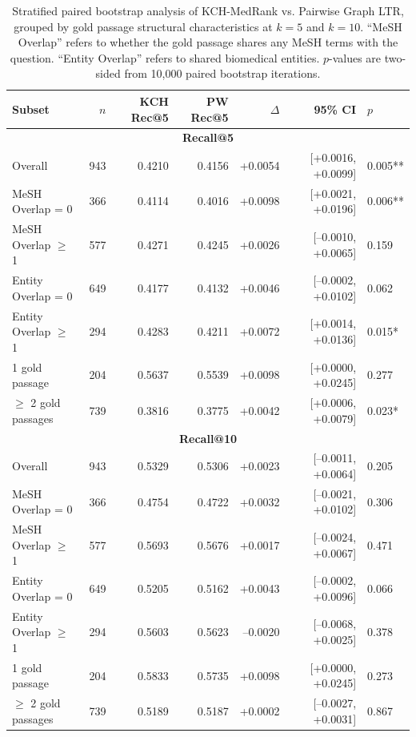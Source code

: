 \begin{table}[t]
\centering
\small
\caption{Stratified paired bootstrap analysis of KCH-MedRank vs. Pairwise Graph LTR, grouped by gold passage structural characteristics at $k=5$ and $k=10$. ``MeSH Overlap'' refers to whether the gold passage shares any MeSH terms with the question. ``Entity Overlap'' refers to shared biomedical entities. $p$-values are two-sided from 10,000 paired bootstrap iterations.}
\label{tab:hypergraph-vs-pairwise-stratified}
\begin{tabular}{lrrrrrl}
\toprule
Subset & $n$ & KCH Rec@5 & PW Rec@5 & $\Delta$ & 95\% CI & $p$ \\
\midrule
\multicolumn{7}{c}{\textbf{Recall@5}} \\
\midrule
Overall & 943 & 0.4210 & 0.4156 & +0.0054 & [+0.0016, +0.0099] & 0.005** \\
\midrule
MeSH Overlap = 0 & 366 & 0.4114 & 0.4016 & +0.0098 & [+0.0021, +0.0196] & 0.006** \\
MeSH Overlap $\geq$ 1 & 577 & 0.4271 & 0.4245 & +0.0026 & [--0.0010, +0.0065] & 0.159 \\
Entity Overlap = 0 & 649 & 0.4177 & 0.4132 & +0.0046 & [--0.0002, +0.0102] & 0.062 \\
Entity Overlap $\geq$ 1 & 294 & 0.4283 & 0.4211 & +0.0072 & [+0.0014, +0.0136] & 0.015* \\
1 gold passage & 204 & 0.5637 & 0.5539 & +0.0098 & [+0.0000, +0.0245] & 0.277 \\
$\geq$ 2 gold passages & 739 & 0.3816 & 0.3775 & +0.0042 & [+0.0006, +0.0079] & 0.023* \\
\midrule
\multicolumn{7}{c}{\textbf{Recall@10}} \\
\midrule
Overall & 943 & 0.5329 & 0.5306 & +0.0023 & [--0.0011, +0.0064] & 0.205 \\
\midrule
MeSH Overlap = 0 & 366 & 0.4754 & 0.4722 & +0.0032 & [--0.0021, +0.0102] & 0.306 \\
MeSH Overlap $\geq$ 1 & 577 & 0.5693 & 0.5676 & +0.0017 & [--0.0024, +0.0067] & 0.471 \\
Entity Overlap = 0 & 649 & 0.5205 & 0.5162 & +0.0043 & [--0.0002, +0.0096] & 0.066 \\
Entity Overlap $\geq$ 1 & 294 & 0.5603 & 0.5623 & --0.0020 & [--0.0068, +0.0025] & 0.378 \\
1 gold passage & 204 & 0.5833 & 0.5735 & +0.0098 & [+0.0000, +0.0245] & 0.273 \\
$\geq$ 2 gold passages & 739 & 0.5189 & 0.5187 & +0.0002 & [--0.0027, +0.0031] & 0.867 \\
\bottomrule
\end{tabular}
\end{table}

